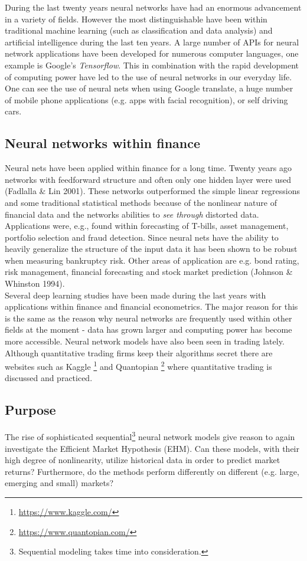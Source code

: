 \documentclass[12pt, letterpaper]{amsart}%
\begin{document}
During the last twenty years neural networks have had an enormous advancement in a variety of fields. However the most distinguishable have been within traditional machine learning (such as classification and data analysis) and artificial intelligence during the last ten years. A large number of APIs for neural network applications have been developed for numerous computer languages, one example is Google's \textit{Tensorflow}. This in combination with the rapid development of computing power have led to the use of neural networks in our everyday life. One can see the use of neural nets when using Google translate, a huge number of mobile phone applications (e.g. apps with facial recognition), or self driving cars.

\subsection{Neural networks within finance}
Neural nets have been applied within finance for a long time. Twenty years ago networks with feedforward structure and often only one hidden layer were used (Fadlalla \& Lin 2001). These networks outperformed the simple linear regressions and some traditional statistical methods because of the nonlinear nature of financial data and the networks abilities to \textit{see through} distorted data. Applications were, e.g., found within forecasting of T-bills, asset management, portfolio selection and fraud detection. Since neural nets have the ability to heavily generalize the structure of the input data it has been shown to be robust when measuring bankruptcy risk. Other areas of application are e.g. bond rating, risk management, financial forecasting and stock market prediction (Johnson \& Whinston 1994).
\\

Several deep learning studies have been made during the last years with applications within finance and financial econometrics. The major reason for this is the same as the reason why neural networks are frequently used within other fields at the moment - data has grown larger and computing power has become more accessible. Neural network models have also been seen in trading lately. Although quantitative trading firms keep their algorithms secret there are websites such as Kaggle \footnote{\url{https://www.kaggle.com/}} and Quantopian \footnote{\url{https://www.quantopian.com/}} where quantitative trading is discussed and practiced.

\subsection{Purpose}
The rise of sophisticated sequential\footnote{Sequential modeling takes time into consideration.} neural network models give reason to again investigate the Efficient Market Hypothesis (EHM). Can these models, with their high degree of nonlinearity, utilize historical data in order to predict market returns? Furthermore, do the methods perform differently on different (e.g. large, emerging and small) markets?
\\
\end{document}
